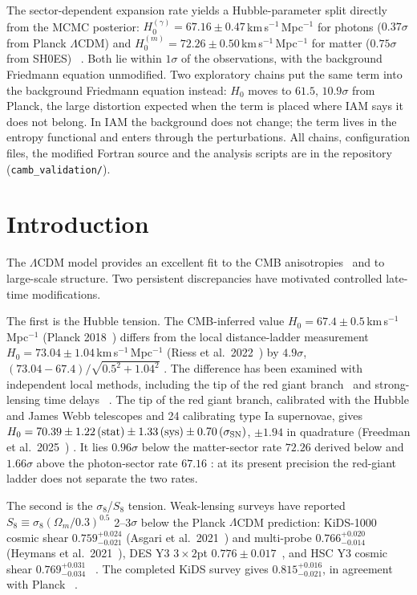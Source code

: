 The sector-dependent expansion rate yields a Hubble-parameter split directly from the MCMC posterior: $H_0^{(\gamma)}=67.16\pm0.47$\,km\,s$^{-1}$\,Mpc$^{-1}$
for photons ($0.37\sigma$ from Planck $\Lambda$CDM) and $H_0^{(m)}=72.26\pm0.50$\,km\,s$^{-1}$\,Mpc$^{-1}$ for matter ($0.75\sigma$ from SH0ES) \measured\ \calc. Both lie
within $1\sigma$ of the observations, with the background Friedmann equation unmodified. Two exploratory chains put the same term into the background Friedmann equation instead: $H_0$ moves to $61.5$, $10.9\sigma$ from Planck, the large distortion expected when the term is placed where IAM says it does not belong. In IAM the background does not change; the term lives in the entropy functional and enters through the perturbations. All chains, configuration files, the modified Fortran source and the analysis scripts are in the repository
(\texttt{camb\_validation/}).

\section{Introduction}\label{sec:l2_intro}
The $\Lambda$CDM model provides an excellent fit to the CMB anisotropies~\cite{Planck2018VI} and to large-scale structure. Two persistent
discrepancies have motivated controlled late-time modifications.

The first is the Hubble tension. The CMB-inferred value $H_0=67.4\pm0.5$\,km\,s$^{-1}$\,Mpc$^{-1}$ (Planck 2018~\cite{Planck2018VI}) differs from the
local distance-ladder measurement $H_0=73.04\pm1.04$\,km\,s$^{-1}$\,Mpc$^{-1}$ (Riess et al.\ 2022~\cite{Riess2022}) by $4.9\sigma$,
$(73.04-67.4)/\sqrt{0.5^2+1.04^2}$ \calc. The difference has been examined with independent local methods, including the tip of the red giant
branch~\cite{Freedman2021} and strong-lensing time delays~\cite{Wong2020} \observed. The tip of the red giant branch, calibrated with the Hubble and
James Webb telescopes and 24 calibrating type Ia supernovae, gives $H_0=70.39\pm1.22\,({\rm stat})\pm1.33\,({\rm sys})\pm0.70\,(\sigma_{\rm SN})$,
$\pm1.94$ in quadrature (Freedman et al.\ 2025~\cite{Freedman2025}) \observed. It lies $0.96\sigma$ below the matter-sector rate $72.26$ derived below
and $1.66\sigma$ above the photon-sector rate $67.16$ \calc: at its present precision the red-giant ladder does not separate the two rates.

The second is the $\sigma_8$/$S_8$ tension. Weak-lensing surveys have reported $S_8\equiv\sigma_8(\Omega_m/0.3)^{0.5}$ 2--3$\sigma$ below the Planck
$\Lambda$CDM prediction: KiDS-1000 cosmic shear $0.759^{+0.024}_{-0.021}$ (Asgari et al.\ 2021~\cite{Asgari2021}) and multi-probe
$0.766^{+0.020}_{-0.014}$ (Heymans et al.\ 2021~\cite{Heymans2021}), DES Y3 $3\times2$pt $0.776\pm0.017$~\cite{DESY3}, and HSC Y3 cosmic shear
$0.769^{+0.031}_{-0.034}$~\cite{HSCY3} \observed. The completed KiDS survey gives $0.815^{+0.016}_{-0.021}$, in agreement with
Planck~\cite{Wright2025} \observed.

